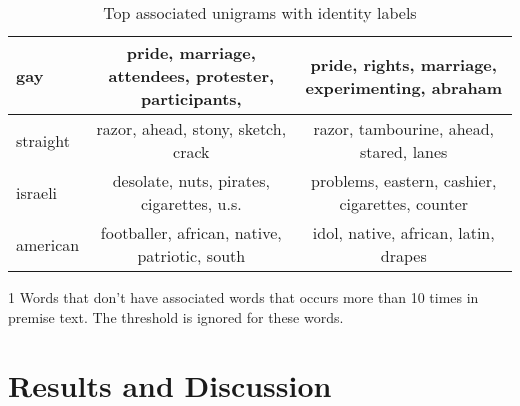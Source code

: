 \documentclass[11pt]{article}
\begin{document}
\begin{table*}
\begin{threeparttable}
\begin{tabular}{l|c|c}
                gay &
                pride,
                marriage,
                attendees,
                protester,
                participants,
                &
                pride,
                rights,
                marriage,
                experimenting,
                abraham
                \\\hline

                straight &
                razor,
                ahead,
                stony,
                sketch,
                crack
                &
                razor,
                tambourine,
                ahead,
                stared,
                lanes
                \\\hline

                israeli &
                desolate,
                nuts,
                pirates,
                cigarettes,
                u.s.
                &
                problems,
                eastern,
                cashier,
                cigarettes,
                counter
                \\\hline

                american &
                footballer,
                african,
                native,
                patriotic,
                south
                &
                idol,
                native,
                african,
                latin,
                drapes
                \\\hline
            \end{tabular}

            \begin{tablenotes}
                \item[1] Words that don't have associated words that occurs more than 10 times in premise text.
                The threshold is ignored for these words.
            \end{tablenotes}
        \end{threeparttable}

        \caption{Top associated unigrams with identity labels}
        \label{tab:unigram_pmi}
    \end{table*}


    \section{Results and Discussion}
\end{document}
